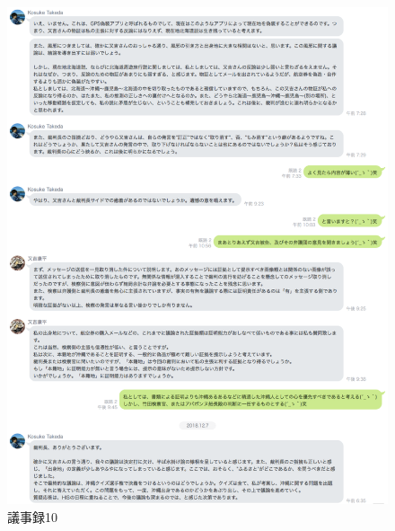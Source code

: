 \begin{figure}[H]
  \centering
  \includegraphics[clip,scale=0.5]{./section/Taira/figures/giji101}
  \caption{議事録10}
\label{giji101}
\end{figure}

